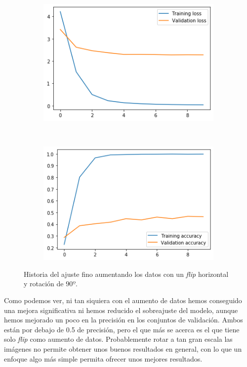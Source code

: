 \documentclass[11pt,a4paper]{article}
\begin{document}
\begin{figure}[H]
  \centering
  \begin{subfigure}{.5\textwidth}
    \centering
    \includegraphics[scale=0.4]{img/fine3fr-loss.png}
    \label{fig:fine3fr-loss}
  \end{subfigure}%
  ~ \quad
  \begin{subfigure}{.5\textwidth}
    \centering
    \includegraphics[scale=0.4]{img/fine3fr-acc.png}
    \label{fig:fine3fr-acc}
  \end{subfigure}
  \caption{Historia del ajuste fino aumentando los datos con un \textit{flip} horizontal y rotación de $90º$.}
  \label{fig:history-fine3fr}
\end{figure}

Como podemos ver, ni tan siquiera con el aumento de datos hemos conseguido una mejora significativa
ni hemos reducido el sobreajuste del modelo, aunque hemos mejorado un poco en la precisión en los
conjuntos de validación. Ambos están por debajo de 0.5 de precisión, pero el que más se acerca
es el que tiene solo \textit{flip} como aumento de datos. Probablemente rotar a tan gran escala
las imágenes no permite obtener unos buenos resultados en general, con lo que un enfoque algo más
simple permita ofrecer unos mejores resultados.
\end{document}
